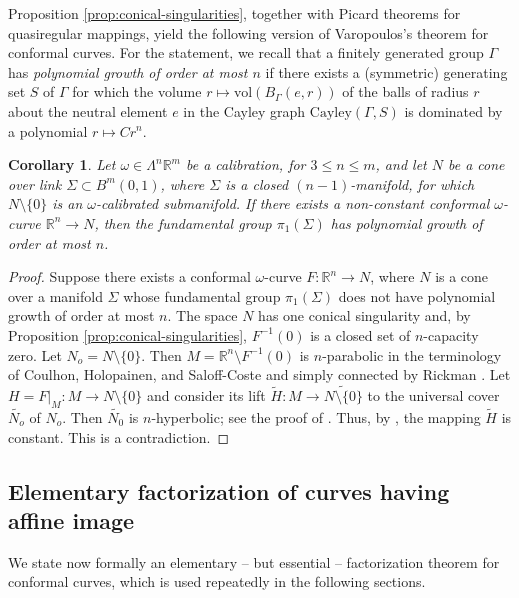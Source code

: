 \documentclass[a4paper,leqno,11pt]{amsart}
\numberwithin{equation}{section}
\newtheorem{corollary}[theorem]{Corollary}
\theoremstyle{remark}
\theoremstyle{remark}
\newcommand{\R}{\mathbb{R}}
\newcommand{\vol}{\mathrm{vol}}
\newcommand{\Cayley}{\mathrm{Cayley}}
\begin{document}
Proposition \ref{prop:conical-singularities}, together with Picard theorems for quasiregular mappings, yield the following version of Varopoulos's theorem for conformal curves. For the statement, we recall that a finitely generated group $\Gamma$ has \emph{polynomial growth of order at most $n$} if there exists a (symmetric) generating set $S$ of $\Gamma$ for which the volume $r\mapsto \vol(B_\Gamma(e,r))$ of the balls of radius $r$ about the neutral element $e$ in the Cayley graph $\Cayley(\Gamma,S)$ is dominated by a polynomial $r\mapsto Cr^n$.

\begin{corollary}
\label{cor:Varopoulos}
Let $\omega \in \Lambda^n \R^m$ be a calibration, for $3 \leq n \leq m$, and let $N$ be a cone over link $\Sigma \subset B^m(0,1)$, where $\Sigma$ is a closed $(n-1)$-manifold, for which $N\setminus \{0\}$ is an $\omega$-calibrated submanifold. If there exists a non-constant conformal $\omega$-curve $\R^n \to N$, then the fundamental group $\pi_1(\Sigma)$ has polynomial growth of order at most $n$. 
\end{corollary}
\begin{proof}
Suppose there exists a conformal $\omega$-curve $F \colon \R^n \to N$, where $N$ is a cone over a manifold $\Sigma$ whose fundamental group $\pi_1(\Sigma)$ does not have polynomial growth of order at most $n$.
The space $N$ has one conical singularity and, by Proposition \ref{prop:conical-singularities}, $F^{-1}(0)$ is a closed set of $n$-capacity zero. Let $N_o = N\setminus \{0\}$. Then $M = \R^n \setminus F^{-1}(0)$ is $n$-parabolic in the terminology of Coulhon, Holopainen, and Saloff-Coste \cite{Cou:Hol:S-C:01} and simply connected by Rickman \cite[Lemma III.5.1]{Ric:93}. Let $H = F|_M \colon M\to N\setminus \{0\}$ and consider its lift $\widetilde H \colon M \to \widetilde{N\setminus \{0\}}$ to the universal cover $\widetilde{N_o}$ of $N_o$. Then $\widetilde{N_0}$ is $n$-hyperbolic; see the proof of \cite[Theorem 1.3]{Pan:Raj:11}. Thus, by \cite[Proposition 5.1]{Cou:Hol:S-C:01}, the mapping $\widetilde H$ is constant. This is a contradiction. 
\end{proof}



\subsection{Elementary factorization of curves having affine image}

We state now formally an elementary -- but essential -- factorization theorem for conformal curves, which is used repeatedly in the following sections. 
\end{document}

